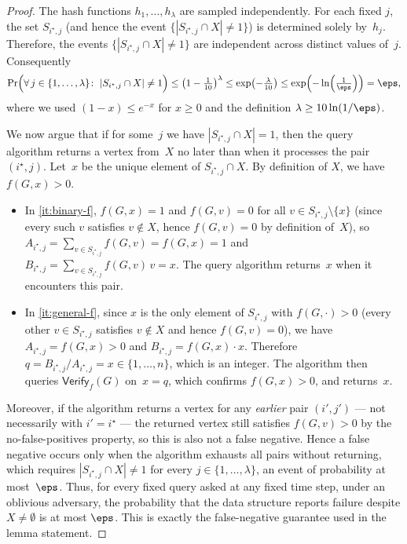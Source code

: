 \begin{proof}
The hash functions $h_1,\dots,h_\lambda$ are sampled independently.
For each fixed $j$, the set $S_{i^\star,j}$ (and hence the event
$\{|S_{i^\star,j}\cap X|\neq 1\}$) is determined solely by~$h_j$.
Therefore, the events $\{|S_{i^\star,j}\cap X|\neq 1\}$ are independent across
distinct values of~$j$.
Consequently
\[
\Pr\Bigl(\forall\, j\in\{1,\dots,\lambda\}\colon\;
|S_{i^\star,j}\cap X|\neq 1\Bigr)
\le \left(1-\tfrac{1}{10}\right)^\lambda
\le \exp\!\left(-\tfrac{\lambda}{10}\right)
\le \exp\!\left(-\ln\!\left(\tfrac{1}{\eps}\right)\right)
= \eps,
\]
where we used $(1-x)\le e^{-x}$ for $x\ge 0$ and the definition
$\lambda\ge 10\ln(1/\eps)$.

We now argue that if for some~$j$ we have $|S_{i^\star,j}\cap X|=1$, then
the query algorithm returns a vertex from~$X$ no later than when it processes
the pair $(i^\star,j)$.
Let~$x$ be the unique element of $S_{i^\star,j}\cap X$.
By definition of $X$, we have $f(G,x)>0$.
\begin{itemize}
\item In \cref{it:binary-f}, $f(G,x)=1$ and $f(G,v)=0$ for all
$v\in S_{i^\star,j}\setminus\{x\}$
(since every such $v$ satisfies $v\notin X$, hence $f(G,v)=0$ by
definition of~$X$), so
$A_{i^\star,j}=\sum_{v\in S_{i^\star,j}}f(G,v)=f(G,x)=1$ and
$B_{i^\star,j}=\sum_{v\in S_{i^\star,j}}f(G,v)\,v=x$.
The query algorithm returns~$x$ when it encounters this pair.
\item In \cref{it:general-f}, since $x$ is the only element of
$S_{i^\star,j}$ with $f(G,\cdot)>0$ (every other $v\in S_{i^\star,j}$
satisfies $v\notin X$ and hence $f(G,v)=0$), we have
$A_{i^\star,j}=f(G,x)>0$ and $B_{i^\star,j}=f(G,x)\cdot x$.
Therefore $q = B_{i^\star,j}/A_{i^\star,j}=x\in\{1,\dots,n\}$,
which is an integer.
The algorithm then queries $\mathsf{Verify}_f(G)$ on~$x=q$,
which confirms $f(G,x)>0$, and returns~$x$.
\end{itemize}
Moreover, if the algorithm returns a vertex for any \emph{earlier} pair
$(i',j')$ --- not necessarily with $i'=i^\star$ --- the returned vertex still
satisfies $f(G,v)>0$ by the no-false-positives property, so this is also
not a false negative.
Hence a false negative occurs only when the algorithm exhausts all pairs
without returning, which requires
$|S_{i^\star,j}\cap X|\neq 1$ for every $j\in\{1,\dots,\lambda\}$, an event
of probability at most~$\eps$.
Thus, for every fixed query asked at any fixed time step, under an oblivious
adversary, the probability that the data structure reports failure despite
$X\neq\emptyset$ is at most $\eps$. This is exactly the false-negative
guarantee used in the lemma statement.


\end{proof}
